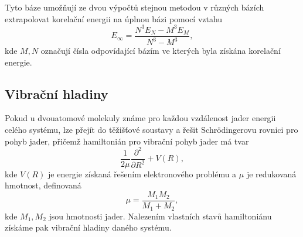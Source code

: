 Tyto báze umožňují ze dvou výpočtů stejnou metodou v různých bázích extrapolovat 
korelační energii na úplnou bázi pomocí vztahu
\begin{equation}
E_\infty = \frac{N^3E_N - M^3E_M}{N^3-M^3},
\end{equation}
kde $M,N$ označují čísla odpovídající bázím ve kterých byla získána korelační energie.

\subsection{Vibrační hladiny}
\label{te_vibr}
Pokud u dvouatomové molekuly známe pro každou vzdálenost jader energii celého systému, 
lze přejít do těžišťové soustavy a řešit Schrödingerovu rovnici pro pohyb jader,
přičemž hamiltonián pro vibrační pohyb jader má tvar
\begin{equation}
\frac{1}{2\mu}\frac{\partial^2}{\partial R^2} + V(R),
\end{equation}
kde $V(R)$ je energie získaná řešením elektronového problému a $\mu$ je redukovaná 
hmotnost, definovaná
\begin{equation}
\mu = \frac{M_1M_2}{M_1+M_2},
\end{equation}
kde $M_1, M_2$ jsou hmotnosti jader. 
Nalezením vlastních stavů hamiltoniánu získáme pak vibrační hladiny daného systému.

